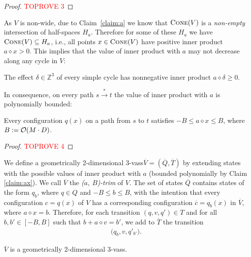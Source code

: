 \documentclass[a4paper, UKenglish, cleveref, autoref, thm-restate]{lipics-v2021}
\newcommand{\Z}{\mathbb{Z}}
\newcommand{\trans}[1]{\stackrel{#1}{\longrightarrow}}
\newcommand{\tran}{\trans{*}}
\newcommand{\OO}{{\cal O}}
\newcommand{\mytrim}[2]{(#1, #2)-trim}
\newcommand{\vass}{{\sc vass}\xspace}
\newcommand{\tvass}{\parvass 3}
\newcommand{\geomvass}{geometrically 2-dimensional \tvass}
\newcommand{\parvass}[1]{{$#1$-\vass}\xspace}
\newcommand{\setfromto}[2]{[#1, #2]}
\newcommand{\cone}[1]{\textsc{Cone}(#1)}
\newcommand{\essdvass}[1]{\overline{#1}}
\newcommand{\innprod}[2]{#1 \diamond #2} \newcommand{\pair}[2]{#1_{#2}}
\begin{document}
\begin{proof}\textcolor{red}{TOPROVE 3}\end{proof}

As $V$ is non-wide, 
due to Claim~\ref{claim:a} we know that $\cone V$ is a \emph{non-empty} intersection of half-spaces $H_a$.
Therefore for some of these $H_a$ we have
$\cone V \subseteq H_a$, i.e.,
all points $x\in\cone V$ have positive inner product $\innprod a x > 0$.
This implies that
the value of  inner product with $a$ may not decrease along any cycle in $V$:
\begin{claim}\label{clm:inner_with_effect}
The effect $\delta\in\Z^3$ of every simple cycle has nonnegative inner product $\innprod a \delta \geq 0$.
\end{claim}
In consequence, on every path $s \tran t$ the value of inner product with $a$ is polynomially
bounded:
\begin{claim} \label{claim:ax}
Every configuration $q(x)$ on a path from $s$ to $t$ satisfies
$-B \leq \innprod a x \leq B$, where $B := \OO(M\cdot D)$. 
\end{claim}
\begin{proof}\textcolor{red}{TOPROVE 4}\end{proof}

We define a \geomvass $\essdvass V = (\essdvass Q, \essdvass T)$ 
by extending states with the possible values of inner product with $a$
(bounded polynomially by Claim \ref{claim:ax}).
We call $\essdvass V$ the \emph{\mytrim {$a$} {$B$}} of $V$. 
The set of states $\essdvass Q$ contains states of the form $\pair q b$, where $q\in Q$ and $-B \leq b \leq B$,
with the intention that every configuration
$c = q(x)$ of $V$ has a corresponding configuration 
$\essdvass c = \pair q b (x)$ in $\essdvass V$, 
where $\innprod a x = b$.
Therefore, for each transition $(q, v, q') \in T$
and for all $b, b'\in \setfromto{-B} B$
such that $b + \innprod a v = b'$,
we add to $\essdvass T$ the transition
\begin{align} \label{eq:tranV}
\big(\pair q b, v, \pair {q'} {b'}\big).
\end{align}


\begin{claim}\label{clm:trim_makes_geom}
$\essdvass V$ is a \geomvass.
\end{claim}
\end{document}
